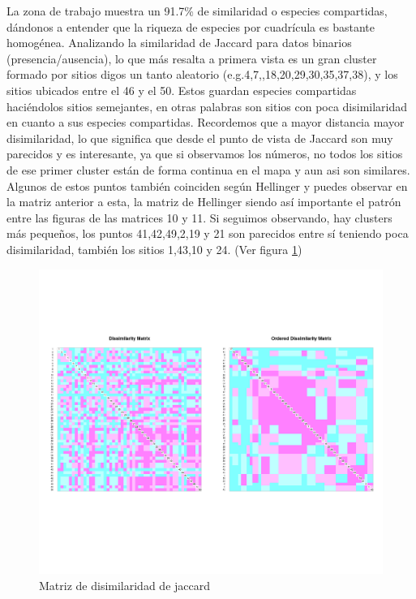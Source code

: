 \documentclass[11pt,]{article}
\begin{document}
La zona de trabajo muestra un 91.7\% de similaridad o especies
compartidas, dándonos a entender que la riqueza de especies por
cuadrícula es bastante homogénea. Analizando la similaridad de Jaccard
para datos binarios (presencia/ausencia), lo que más resalta a primera
vista es un gran cluster formado por sitios digos un tanto aleatorio
(e.g.4,7,,18,20,29,30,35,37,38), y los sitios ubicados entre el 46 y el
50. Estos guardan especies compartidas haciéndolos sitios semejantes, en
otras palabras son sitios con poca disimilaridad en cuanto a sus
especies compartidas. Recordemos que a mayor distancia mayor
disimilaridad, lo que significa que desde el punto de vista de Jaccard
son muy parecidos y es interesante, ya que si observamos los números, no
todos los sitios de ese primer cluster están de forma continua en el
mapa y aun asi son similares. Algunos de estos puntos también coinciden
según Hellinger y puedes observar en la matriz anterior a esta, la
matriz de Hellinger siendo así importante el patrón entre las figuras de
las matrices 10 y 11. Si seguimos observando, hay clusters más pequeños,
los puntos 41,42,49,2,19 y 21 son parecidos entre sí teniendo poca
disimilaridad, también los sitios 1,43,10 y 24. (Ver figura
\ref{fig:diss_jaccard})

\begin{figure}
\centering
\includegraphics{diss_jaccard.png}
\caption{\label{fig:diss_jaccard}Matriz de disimilaridad de jaccard}
\end{figure}
\end{document}
